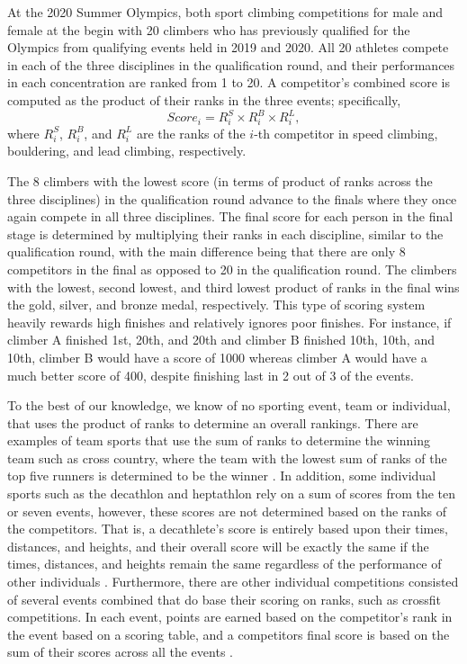 \documentclass[12pt]{article}
\begin{document}
At the 2020 Summer Olympics, both sport climbing competitions for male
and female at the begin with 20 climbers who has previously qualified
for the Olympics from qualifying events held in 2019 and 2020. All 20
athletes compete in each of the three disciplines in the qualification
round, and their performances in each concentration are ranked from 1 to
20. A competitor's combined score is computed as the product of their
ranks in the three events; specifically, \begin{equation}
Score_i = R^S_i\times R^B_i\times R^L_i,
\end{equation} where \(R^S_i\), \(R^B_i\), and \(R^L_i\) are the ranks
of the \(i\)-th competitor in speed climbing, bouldering, and lead
climbing, respectively.

The 8 climbers with the lowest score (in terms of product of ranks
across the three disciplines) in the qualification round advance to the
finals where they once again compete in all three disciplines. The final
score for each person in the final stage is determined by multiplying
their ranks in each discipline, similar to the qualification round, with
the main difference being that there are only 8 competitors in the final
as opposed to 20 in the qualification round. The climbers with the
lowest, second lowest, and third lowest product of ranks in the final
wins the gold, silver, and bronze medal, respectively. This type of
scoring system heavily rewards high finishes and relatively ignores poor
finishes. For instance, if climber A finished 1st, 20th, and 20th and
climber B finished 10th, 10th, and 10th, climber B would have a score of
1000 whereas climber A would have a much better score of 400, despite
finishing last in 2 out of 3 of the events.

To the best of our knowledge, we know of no sporting event, team or
individual, that uses the product of ranks to determine an overall
rankings. There are examples of team sports that use the sum of ranks to
determine the winning team such as cross country, where the team with
the lowest sum of ranks of the top five runners is determined to be the
winner \citep{hammond2007, boudreau2018}. In addition, some individual
sports such as the decathlon and heptathlon rely on a sum of scores from
the ten or seven events, however, these scores are not determined based
on the ranks of the competitors. That is, a decathlete's score is
entirely based upon their times, distances, and heights, and their
overall score will be exactly the same if the times, distances, and
heights remain the same regardless of the performance of other
individuals \citep{westera2006}. Furthermore, there are other individual
competitions consisted of several events combined that do base their
scoring on ranks, such as crossfit competitions. In each event, points
are earned based on the competitor's rank in the event based on a
scoring table, and a competitors final score is based on the sum of
their scores across all the events \citep{crossfit2021}.
\end{document}
